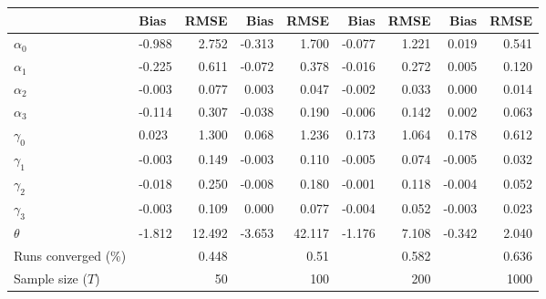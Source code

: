 
\begin{tabular}[t]{llrrrrrrr}
\toprule
  & Bias & RMSE & Bias & RMSE & Bias & RMSE & Bias & RMSE\\
\midrule
$\alpha_{0}$ & -0.988 & 2.752 & -0.313 & 1.700 & -0.077 & 1.221 & 0.019 & 0.541\\
$\alpha_{1}$ & -0.225 & 0.611 & -0.072 & 0.378 & -0.016 & 0.272 & 0.005 & 0.120\\
$\alpha_{2}$ & -0.003 & 0.077 & 0.003 & 0.047 & -0.002 & 0.033 & 0.000 & 0.014\\
$\alpha_{3}$ & -0.114 & 0.307 & -0.038 & 0.190 & -0.006 & 0.142 & 0.002 & 0.063\\
$\gamma_{0}$ & 0.023 & 1.300 & 0.068 & 1.236 & 0.173 & 1.064 & 0.178 & 0.612\\
$\gamma_{1}$ & -0.003 & 0.149 & -0.003 & 0.110 & -0.005 & 0.074 & -0.005 & 0.032\\
$\gamma_{2}$ & -0.018 & 0.250 & -0.008 & 0.180 & -0.001 & 0.118 & -0.004 & 0.052\\
$\gamma_{3}$ & -0.003 & 0.109 & 0.000 & 0.077 & -0.004 & 0.052 & -0.003 & 0.023\\
$\theta$ & -1.812 & 12.492 & -3.653 & 42.117 & -1.176 & 7.108 & -0.342 & 2.040\\
Runs converged (\%) &  & 0.448 &  & 0.51 &  & 0.582 &  & 0.636\\
Sample size ($T$) &  & 50 &  & 100 &  & 200 &  & 1000\\
\bottomrule
\end{tabular}
